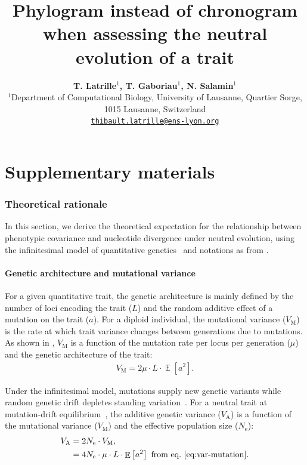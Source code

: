 \documentclass{article}
\title{Phylogram instead of chronogram when assessing the neutral evolution of a trait}
\author{
\large
\textbf{T. {Latrille}$^{1}$\orcidlink{0000-0002-9643-4668}, T. {Gaboriau}$^{1}$\orcidlink{0000-0001-7530-2204}, N. {Salamin}$^{1}$\orcidlink{0000-0002-3963-4954}}\\
\normalsize
$^{1}$Department of Computational Biology, University of Lausanne, Quartier Sorge, 1015 Lausanne, Switzerland\\
\texttt{\href{mailto:thibault.latrille@ens-lyon.org}{thibault.latrille@ens-lyon.org}} \\
}
\newcommand{\Multiply}{\cdot}
\DeclareMathOperator{\E}{\mathbb{E}}
\newcommand{\Ne}{N_{\text{e}}}
\newcommand{\MutationRatePheno}{\mu}
\newcommand{\NbrLoci}{L}
\newcommand{\VarGenetic}{V_{\mathrm{A}}}
\newcommand{\VarMutation}{V_{\mathrm{M}}}
\newcommand{\GenArchi}{\NbrLoci \Multiply \E \left[ a^2 \right]}
\renewcommand{\baselinestretch}{1.3}
\begin{document}
\part*{Supplementary materials}
\renewcommand{\thetable}{S\arabic{table}}
\renewcommand{\thefigure}{S\arabic{figure}}
\setcounter{figure}{0}
\setcounter{table}{0}
\setcounter{section}{0}

\renewcommand{\baselinestretch}{1.0}\normalsize
\tableofcontents
\renewcommand{\baselinestretch}{1.2}\normalsize

\newpage

\section{Theoretical rationale}\label{sec:theoretical-rationale}

In this section, we derive the theoretical expectation for the relationship between phenotypic covariance and nucleotide divergence under neutral evolution, using the infinitesimal model of quantitative genetics~\citep{lande_quantitative_1979, lande_sexual_1980} and notations as from \citet{latrille_detecting_2024}.

\subsection{Genetic architecture and mutational variance}

For a given quantitative trait, the genetic architecture is mainly defined by the number of loci encoding the trait ($\NbrLoci$) and the random additive effect of a mutation on the trait ($a$).
For a diploid individual, the mutational variance ($\VarMutation$) is the rate at which trait variance changes between generations due to mutations.
As shown in \citet{lande_quantitative_1979, lande_sexual_1980}, $\VarMutation$ is a function of the mutation rate per locus per generation ($\MutationRatePheno$) and the genetic architecture of the trait:
\begin{align}
    \VarMutation = 2 \MutationRatePheno \Multiply \GenArchi \label{eq:var-mutation}.
\end{align}

Under the infinitesimal model, mutations supply new genetic variants while random genetic drift depletes standing variation~\citep{turelli_commentary_2017, barton_infinitesimal_2017, sella_thinking_2019}.
For a neutral trait at mutation-drift equilibrium~\citep{lynch_mutation_1998}, the additive genetic variance ($\VarGenetic$) is a function of the mutational variance ($\VarMutation$) and the effective population size ($\Ne$):
\begin{align}
    \VarGenetic & = 2 \Ne \Multiply \VarMutation, \\
    & = 4 \Ne \Multiply \MutationRatePheno \Multiply \GenArchi \text{ from eq.~\ref{eq:var-mutation}}. \label{eq:var-genetic}
\end{align}
\end{document}
